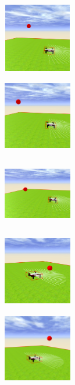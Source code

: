 \begin{figure}[H]
\begin{subfigure}[t]{0.2\textwidth}
\label{fig:figure2_5}
\end{subfigure}\hfill
\begin{subfigure}[t]{0.2\textwidth}
    \includegraphics[width=3cm, height=3cm]{img/followBallTello6.png}
\label{fig:figure2_6}
\end{subfigure}\hfill
\begin{subfigure}[t]{0.2\textwidth}
    \includegraphics[width=3cm, height=3cm]{img/followBallTello7.png}
\label{fig:figure2_7}
\end{subfigure}\hfill
\begin{subfigure}[t]{0.2\textwidth}
    \includegraphics[width=3cm, height=3cm]{img/followBallTello8.png}
\label{fig:figure2_8}
\end{subfigure}
\begin{subfigure}[t]{0.2\textwidth}
    \includegraphics[width=3cm, height=3cm]{img/followBallTello9.png}
\label{fig:figure2_9}
\end{subfigure}\hfill
\begin{subfigure}[t]{0.2\textwidth}
    \includegraphics[width=3cm, height=3cm]{img/followBallTello10.png}

\end{subfigure}
\end{figure}
